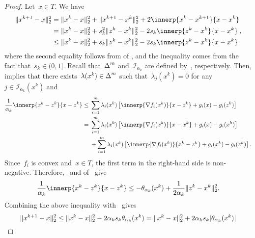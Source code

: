 \documentclass[../main]{subfiles}
\begin{document}
\begin{proof}
    Let~$x \in T$.
    We have
    \begin{equation} \label{eq:pgm_convergence:fejer_pre}
        \begin{aligned}
            \norm{x^{k + 1} - x}_2^2 &= \norm{x^k - x}_2^2 + \norm{x^{k + 1} - x^k}_2^2 + 2 \innerp{x^k - x^{k + 1}}{x - x^k} \\
                                     &= \norm{x^k - x}_2^2 + s_k^2 \norm{z^k - x^k}_2^2 - 2 s_k \innerp{z^k - x^k}{x - x^k} \\
                                     &\le \norm{x^k - x}_2^2 + s_k \norm{z^k - x^k}_2^2 - 2 s_k \innerp{z^k - x^k}{x - x^k}
        \end{aligned}
    ,\end{equation}
    where the second equality follows from  of , and the inequality comes from the fact that~$s_k \in (0, 1]$.
    Recall that~$\operatorname{\Delta}^m$ and~$\mathcal{I}_{\alpha_k}$ are defined by~, respectively.
    Then,  implies that there exists~$\lambda(x^k) \in \operatorname{\Delta}^m$ such that~$\lambda_j(x^k) = 0$ for any~$j \in \mathcal{I}_{\alpha_k}(x^k)$ and
    \begin{align}
        \frac{1}{\alpha_k} \innerp{x^k - z^k}{x - z^k} \le{}& \sum_{i = 1}^{m} \lambda_i(x^k) \left[ \innerp{\nabla f_i(x^k)}{x - z^k} + g_i(x) - g_i(z^k) \right] \\
        ={}& \sum_{i = 1}^{m} \lambda_i(x^k) \left[ \innerp{\nabla f_i(x^k)}{x - x^k} + g_i(x) - g_i(x^k) \right] \\
           &+ \sum_{i = 1}^{m} \lambda_i(x^k) \left[ \innerp{\nabla f_i(x^k)}{x^k - z^k} + g_i(x^k) - g_i(z^k) \right]
    .\end{align}
    Since~$f_i$ is convex and~$x \in T$, the first term in the right-hand side is non-negative.
    Therefore,~ and  of~ give
    \begin{equation}
        \frac{1}{\alpha_k} \innerp{x^k - z^k}{x - z^k} \le - \theta_{\alpha_k}(x^k) + \frac{1}{2 \alpha_k} \norm{z^k - x^k}_2^2
    .\end{equation} 
    Combining the above inequality with~ gives
    \begin{equation}
        \norm{x^{k + 1} - x}_2^2 \le \norm{x^k - x}_2^2 - 2 \alpha_k s_k \theta_{\alpha_k}(x^k) = \norm{x^k - x}_2^2 + 2 \alpha_k s_k \abs{\theta_{\alpha_k}(x^k)}

\end{equation}
\end{proof}
\end{document}
